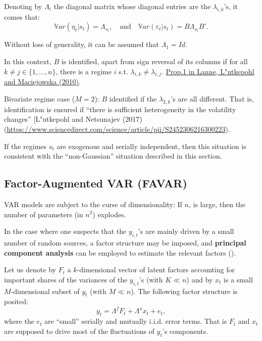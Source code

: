 \documentclass[
]{book}
\theoremstyle{definition}
\theoremstyle{definition}
\theoremstyle{definition}
\theoremstyle{definition}
\theoremstyle{remark}
\begin{document}
Denoting by \(\Lambda_i\) the diagonal matrix whose diagonal entries are the \(\lambda_{i,k}\)'s, it comes that:
\[
\mathbb{V}ar(\eta_{t}|s_t) = \Lambda_{s_t},\quad \mbox{and}\quad \mathbb{V}ar(\varepsilon_{t}|s_t) = B\Lambda_{s_t}B'.
\]

Without loss of generality, it can be assumed that \(\Lambda_1=Id\).

In this context, \(B\) is identified, apart from sign reversal of its columns if for all \(k \ne j \in \{1,\dots,n\}\), there is a regime \(i\) s.t. \(\lambda_{i,k} \ne \lambda_{i,j}\). \href{https://www.sciencedirect.com/science/article/pii/S0165188909001481\#!}{Prop.1 in Lanne, L"utkepohl and Maciejowska (2010)}.

Bivariate regime case (\(M=2\)): \(B\) identified if the \(\lambda_{2,k}\)'s are all different. That is, identification is ensured if ``there is sufficient heterogeneity in the volatility changes'' {[}L"utkepohl and Netsunajev (2017)(\url{https://www.sciencedirect.com/science/article/pii/S2452306216300223}).

If the regimes \(s_t\) are exogenous and serially independent, then this situation is consistent with the ``non-Gaussian'' situation described in this section.

\hypertarget{factor-augmented-var-favar}{%
\subsection{Factor-Augmented VAR (FAVAR)}\label{factor-augmented-var-favar}}

VAR models are subject to the curse of dimensionality: If \(n\), is large, then the number of parameters (in \(n^2\)) explodes.

In the case where one suspects that the \(y_{i,t}\)'s are mainly driven by a small number of random sources, a factor structure may be imposed, and \textbf{principal component analysis} can be employed to estimate the relevant factors (\citet{Bernanke_Boivin_Eliasz_2005}).

Let us denote by \(F_t\) a \(k\)-dimensional vector of latent factors accounting for important shares of the variances of the \(y_{i,t}\)'s (with \(K \ll n\)) and by \(x_t\) is a small \(M\)-dimensional subset of \(y_t\) (with \(M \ll n\)). The following factor structure is posited:
\[
y_t = \Lambda^f F_t + \Lambda^x x_t + e_t,
\]
where the \(e_t\) are ``small'' serially and mutually i.i.d. error terms. That is \(F_t\) and \(x_t\) are supposed to drive most of the fluctuations of \(y_t\)'s components.
\end{document}

